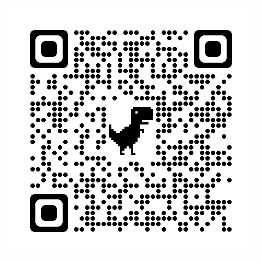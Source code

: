 \documentclass[a4paper,10pt]{article}
\begin{document}
\includegraphics[width=6.5cm, height=6.5cm]{Figures/Apple.png}


\end{document}

